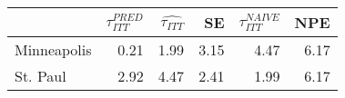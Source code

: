
\begin{tabular}{lrrrrr}
\toprule
  & $\tau_{ITT}^{PRED}$ & $\hat{\tau_{ITT}}$ & SE & $\tau_{ITT}^{NAIVE}$ & NPE\\
\midrule
Minneapolis & 0.21 & 1.99 & 3.15 & 4.47 & 6.17\\
St. Paul & 2.92 & 4.47 & 2.41 & 1.99 & 6.17\\
\bottomrule
\end{tabular}